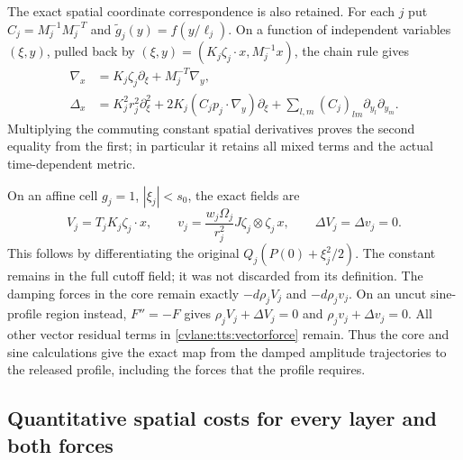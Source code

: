 The exact spatial coordinate correspondence is also retained.
For each $j$ put $C_j=M_j^{-1}M_j^{-T}$ and
$\widetilde g_j(y)=f(y/\ell_j)$. On a function of independent
variables $(\xi,y)$, pulled back by
$(\xi,y)=(K_j\zeta_j\cdot x,M_j^{-1}x)$, the chain rule gives
\begin{equation}\label{cvlane:tts:metric}
 \begin{split}
 \nabla_x&=K_j\zeta_j\partial_\xi+M_j^{-T}\nabla_y,\\
 \Delta_x&=K_j^2r_j^2\partial_\xi^2
   +2K_j(C_jp_j\cdot\nabla_y)\partial_\xi
   +\sum_{l,m}(C_j)_{lm}\partial_{y_l}\partial_{y_m}.
 \end{split}
\end{equation}
Multiplying the commuting constant spatial derivatives proves the
second equality from the first; in particular it retains all mixed
terms and the actual time-dependent metric.

On an affine cell $g_j=1$, $|\xi_j|<s_0$, the exact fields are
\begin{equation}\label{cvlane:tts:core}
 V_j=T_jK_j\zeta_j\cdot x,\qquad
 v_j=\frac{w_j\Omega_j}{r_j^2}J\zeta_j\otimes\zeta_j\,x,
 \qquad\Delta V_j=\Delta v_j=0.
\end{equation}
This follows by differentiating the original
$Q_j(P(0)+\xi_j^2/2)$. The constant remains in the full cutoff
field; it was not discarded from its definition. The damping forces
in the core remain exactly $-d\rho_jV_j$ and $-d\rho_jv_j$.
On an uncut sine-profile region instead, $F''=-F$ gives
$\rho_jV_j+\Delta V_j=0$ and
$\rho_jv_j+\Delta v_j=0$. All other vector residual terms in
\eqref{cvlane:tts:vectorforce} remain. Thus the core and sine calculations
give the exact map from the damped amplitude trajectories to the
released profile, including the forces that the profile requires.

\subsection{Quantitative spatial costs for every layer and both forces}

